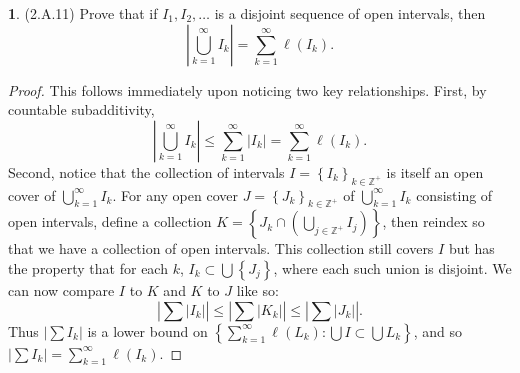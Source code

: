 \documentclass[12pt]{article}
\theoremstyle{definition}
\newtheorem{ex}{}
\begin{document}
\begin{ex}
	(2.A.11)
	Prove that if $I_1, I_2, \dots $ is a disjoint sequence of open intervals, then \begin{equation*}
		\left| \bigcup_{k=1}^\infty I_k \right| = \sum_{k=1}^\infty \ell(I_k).
	\end{equation*}
\end{ex}
\begin{proof}
	This follows immediately upon noticing two key relationships.
	First, by countable subadditivity, \begin{equation*}
		\left| \bigcup_{k=1}^\infty I_k \right| \leq \sum_{k=1}^\infty |I_k| = \sum_{k=1}^\infty \ell(I_k).
	\end{equation*}
	Second, notice that the collection of intervals $I = \left\lbrace I_k \right\rbrace_{k \in \mathbb{Z}^+}$ is itself an open cover of $\bigcup_{k=1}^\infty I_k$.
	For any open cover $J = \left\lbrace J_k \right\rbrace_{k \in \mathbb{Z}^+}$ of $\bigcup_{k=1}^\infty I_k$ consisting of open intervals, define a collection $K = \left\lbrace J_k \cap \left( \bigcup_{j \in \mathbb{Z}^+} I_j \right) \right\rbrace$, then reindex so that we have a collection of open intervals.
	This collection still covers $I$ but has the property that for each $k$, $I_k \subset \bigcup \left\lbrace J_j \right\rbrace$, where each such union is disjoint.
	We can now compare $I$ to $K$ and $K$ to $J$ like so: \begin{equation*}
		\left| \sum |I_k| \right| \leq \left| \sum |K_k| \right| \leq \left| \sum |J_k| \right|.
	\end{equation*}
	Thus $\left| \sum I_k \right|$ is a lower bound on $\left\lbrace \sum_{k=1}^\infty \ell(L_k) : \bigcup I \subset \bigcup L_k \right\rbrace$, and so $\left| \sum I_k \right| = \sum_{k=1}^\infty \ell(I_k)$.
\end{proof}
\end{document}
